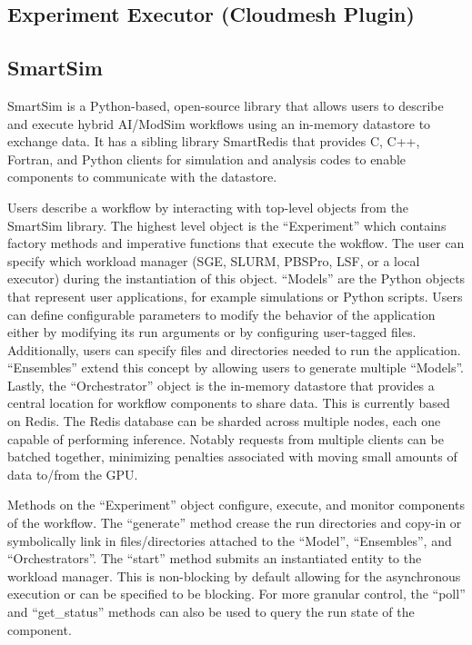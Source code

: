 \documentclass[utf8]{FrontiersinVancouver} %
\begin{document}
\citep{las-frontiers-edu}

\subsection{Experiment Executor (Cloudmesh Plugin)}

\subsection{SmartSim}
SmartSim is a Python-based, open-source library that allows users to describe
and execute hybrid AI/ModSim workflows using an in-memory datastore to exchange
data. It has a sibling library SmartRedis that provides C, C++, Fortran, and 
Python clients for simulation and analysis codes to enable components to
communicate with the datastore.

Users describe a workflow by interacting with top-level objects from the
SmartSim library. The highest level object is the ``Experiment'' which contains
factory methods and imperative functions that execute the wokflow. The user can
specify which workload manager (SGE, SLURM, PBSPro, LSF, or a local executor) during
the instantiation of this object. ``Models'' are the Python objects that
represent user applications, for example simulations or Python scripts. Users
can define configurable parameters to modify the behavior of the application
either by modifying its run arguments or by configuring user-tagged files.
Additionally, users can specify files and directories needed to run the
application. ``Ensembles'' extend this concept by allowing users to generate
multiple ``Models''. Lastly, the ``Orchestrator'' object is the in-memory
datastore that provides a central location for workflow components to share
data. This is currently based on Redis. The Redis database can be sharded across
multiple nodes, each one capable of performing inference. Notably requests from
multiple clients can be batched together, minimizing penalties associated with
moving small amounts of data to/from the GPU.

Methods on the ``Experiment'' object configure, execute, and monitor components
of the workflow. The ``generate'' method crease the run directories and copy-in
or symbolically link in files/directories attached to the ``Model'',
``Ensembles'', and ``Orchestrators''. The ``start'' method submits an
instantiated entity to the workload manager. This is non-blocking by default
allowing for the asynchronous execution or can be specified to be blocking.
For more granular control, the ``poll'' and ``get\_status'' methods can also
be used to query the run state of the component.
\end{document}
